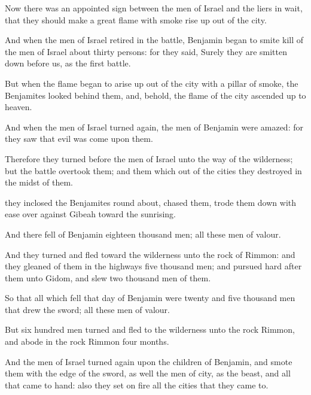 {Now there was an appointed
sign between the
men of
Israel
and the liers in
wait, that they should make a
great
flame with
smoke rise
up out of the
city.

And when the
men of
Israel
retired in the
battle,
Benjamin
began to
smite
{}
kill of the
men of
Israel about
thirty
persons: for they
said,
Surely they are smitten
down
before us, as
{} the
first
battle.

But when the
flame
began to arise
up out of the
city with a
pillar of
smoke, the
Benjamites
looked
behind them, and, behold, the
flame of the
city ascended
up to
heaven.

And when the
men of
Israel turned
again, the
men of
Benjamin were
amazed: for they
saw that
evil was
come upon them.

Therefore they
turned
{}
before the
men of
Israel unto the
way of the
wilderness; but the
battle
overtook them; and them which
{} out of the
cities they
destroyed in the
midst of them.

 they
inclosed the
Benjamites round
about,
{}
chased them,
{} trode them
down with
ease over
against
Gibeah toward the
sunrising.

And there
fell of
Benjamin
eighteen
thousand
men; all these
{}
men of
valour.

And they
turned and
fled toward the
wilderness unto the
rock of
Rimmon: and they
gleaned of them in the
highways
five
thousand
men; and
pursued hard
after them unto
Gidom, and
slew two
thousand
men of them.

So that all which
fell that
day of
Benjamin were
twenty and
five
thousand
men that
drew the
sword; all these
{}
men of
valour.

But
six
hundred
men
turned and
fled to the
wilderness unto the
rock
Rimmon, and
abode in the
rock
Rimmon
four
months.

And the
men of
Israel turned
again upon the
children of
Benjamin, and
smote them with the
edge of the
sword, as well the
men of
{}
city,
as the
beast, and all that came to
hand: also they
set on
fire all the
cities that they came
to.




}
